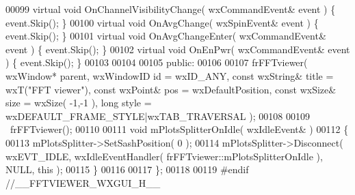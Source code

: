 \begin{DoxyCode}
00099         \textcolor{keyword}{virtual} \textcolor{keywordtype}{void} OnChannelVisibilityChange( wxCommandEvent& event ) \{ \textcolor{keyword}{event}.Skip(); \}
00100         \textcolor{keyword}{virtual} \textcolor{keywordtype}{void} OnAvgChange( wxSpinEvent& event ) \{ \textcolor{keyword}{event}.Skip(); \}
00101         \textcolor{keyword}{virtual} \textcolor{keywordtype}{void} OnAvgChangeEnter( wxCommandEvent& event ) \{ \textcolor{keyword}{event}.Skip(); \}
00102         \textcolor{keyword}{virtual} \textcolor{keywordtype}{void} OnEnPwr( wxCommandEvent& event ) \{ \textcolor{keyword}{event}.Skip(); \}
00103         
00104     
00105     \textcolor{keyword}{public}:
00106         
00107         frFFTviewer( wxWindow* parent, wxWindowID \textcolor{keywordtype}{id} = wxID\_ANY, \textcolor{keyword}{const} wxString& title = wxT(\textcolor{stringliteral}{"FFT viewer"}),
       \textcolor{keyword}{const} wxPoint& pos = wxDefaultPosition, \textcolor{keyword}{const} wxSize& size = wxSize( -1,-1 ), \textcolor{keywordtype}{long} style = 
      wxDEFAULT\_FRAME\_STYLE|wxTAB\_TRAVERSAL );
00108         
00109         ~frFFTviewer();
00110         
00111         \textcolor{keywordtype}{void} mPlotsSplitterOnIdle( wxIdleEvent& )
00112         \{
00113             mPlotsSplitter->SetSashPosition( 0 );
00114             mPlotsSplitter->Disconnect( wxEVT\_IDLE, wxIdleEventHandler( 
      frFFTviewer::mPlotsSplitterOnIdle ), NULL, \textcolor{keyword}{this} );
00115         \}
00116     
00117 \};
00118 
00119 \textcolor{preprocessor}{#endif //\_\_FFTVIEWER\_WXGUI\_H\_\_}
\end{DoxyCode}
